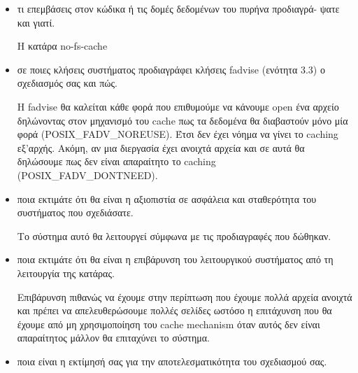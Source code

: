 \documentclass[a4paper,10pt]{article} \usepackage{anysize}
\begin{document}
\begin{itemize}

    \item τι επεμβάσεις στον κώδικα ή τις δομές δεδομένων του πυρήνα προδιαγρά-
        ψατε και γιατί.

        Η κατάρα no-fs-cache 

    \item σε ποιες κλήσεις συστήματος προδιαγράφει κλήσεις fadvise (ενότητα 3.3) ο
        σχεδιασμός σας και πώς.

        Η fadvise θα καλείται κάθε φορά που επιθυμούμε να κάνουμε open ένα
        αρχείο δηλώνοντας στον μηχανισμό του cache πως τα δεδομένα θα
        διαβαστούν μόνο μία φορά (POSIX\_FADV\_NOREUSE). Έτσι δεν έχει νόημα να γίνει το caching
        εξ'αρχής. Ακόμη, αν μια διεργασία έχει ανοιχτά αρχεία και σε αυτά θα
        δηλώσουμε πως δεν είναι απαραίτητο το caching (POSIX\_FADV\_DONTNEED).

    \item ποια εκτιμάτε ότι θα είναι η αξιοπιστία σε ασφάλεια και σταθερότητα του
        συστήματος που σχεδιάσατε.

        Το σύστημα αυτό θα λειτουργεί σύμφωνα με τις προδιαγραφές που δώθηκαν.

    \item ποια εκτιμάτε ότι θα είναι η επιβάρυνση του λειτουργικού συστήματος από
        τη λειτουργία της κατάρας.

        Επιβάρυνση πιθανώς να έχουμε στην περίπτωση που έχουμε πολλά αρχεία
        ανοιχτά και πρέπει να απελευθερώσουμε πολλές σελίδες ωστόσο η
        επιτάχυνση που θα έχουμε από μη χρησιμοποίηση του cache mechanism όταν
        αυτός δεν είναι απαραίτητος μάλλον θα επιταχύνει το σύστημα.

    \item ποια είναι η εκτίμησή σας για την αποτελεσματικότητα του σχεδιασμού σας.
\end{itemize}
\end{document}
